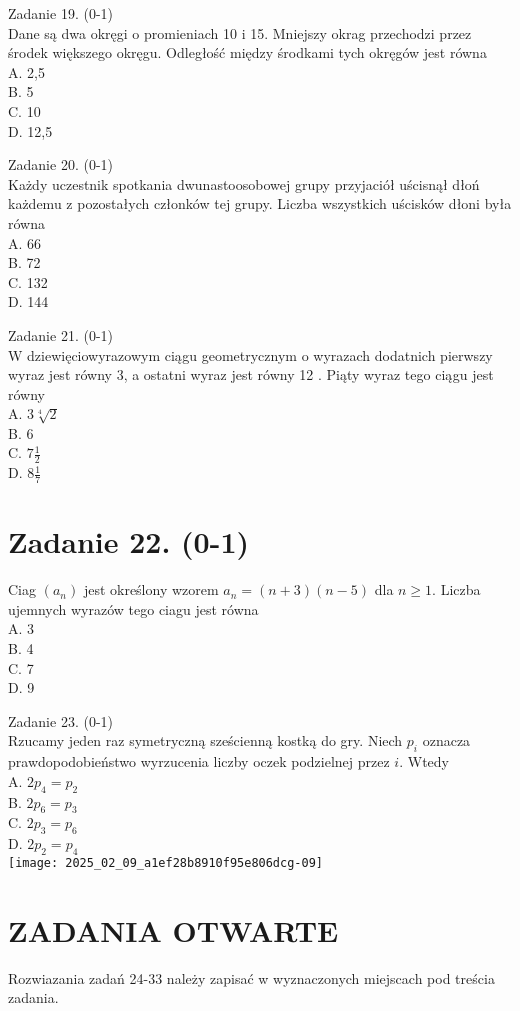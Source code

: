\documentclass[10pt]{article}
\begin{document}
Zadanie 19. (0-1)\\
Dane są dwa okręgi o promieniach 10 i 15. Mniejszy okrag przechodzi przez środek większego okręgu. Odległość między środkami tych okręgów jest równa\\
A. 2,5\\
B. 5\\
C. 10\\
D. 12,5

Zadanie 20. (0-1)\\
Każdy uczestnik spotkania dwunastoosobowej grupy przyjaciół uścisnął dłoń każdemu z pozostałych członków tej grupy. Liczba wszystkich uścisków dłoni była równa\\
A. 66\\
B. 72\\
C. 132\\
D. 144

Zadanie 21. (0-1)\\
W dziewięciowyrazowym ciągu geometrycznym o wyrazach dodatnich pierwszy wyraz jest równy 3, a ostatni wyraz jest równy 12 . Piąty wyraz tego ciągu jest równy\\
A. \(3 \sqrt[4]{2}\)\\
B. 6\\
C. \(7 \frac{1}{2}\)\\
D. \(8 \frac{1}{7}\)

\section*{Zadanie 22. (0-1)}
Ciag \(\left(a_{n}\right)\) jest określony wzorem \(a_{n}=(n+3)(n-5)\) dla \(n \geq 1\). Liczba ujemnych wyrazów tego ciagu jest równa\\
A. 3\\
B. 4\\
C. 7\\
D. 9

Zadanie 23. (0-1)\\
Rzucamy jeden raz symetryczną sześcienną kostką do gry. Niech \(p_{i}\) oznacza prawdopodobieństwo wyrzucenia liczby oczek podzielnej przez \(i\). Wtedy\\
A. \(2 p_{4}=p_{2}\)\\
B. \(2 p_{6}=p_{3}\)\\
C. \(2 p_{3}=p_{6}\)\\
D. \(2 p_{2}=p_{4}\)\\
\texttt{[image: 2025\_02\_09\_a1ef28b8910f95e806dcg-09]}

\section*{ZADANIA OTWARTE}
Rozwiazania zadań 24-33 należy zapisać w wyznaczonych miejscach pod treścia zadania.
\end{document}

